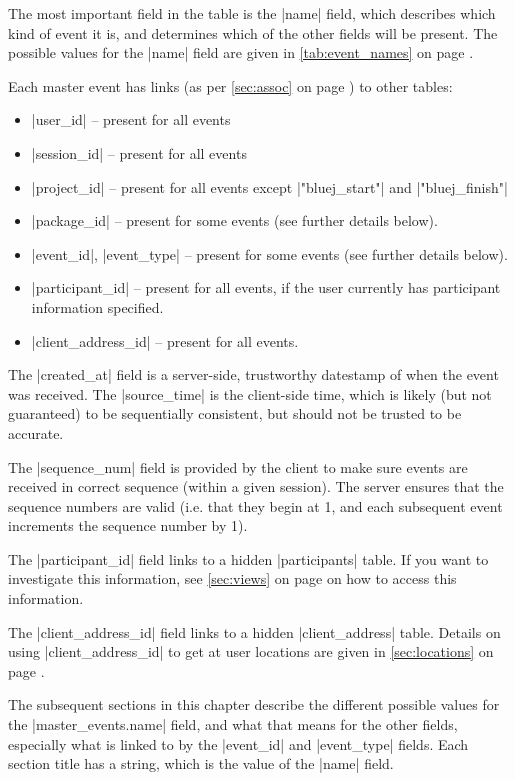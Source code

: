 \documentclass{report}
\newcommand{\myref}[1]{\autoref{#1} on page \pageref*{#1}}
\begin{document}

The most important field in the table is the |name| field, which describes
which kind of event it is, and determines which of the other fields will be
present.  The possible values for the |name| field are given in \myref{tab:event_names}.

Each master event has links (as per \myref{sec:assoc}) to other tables:
\begin{itemize}
\item |user_id| -- present for all events
\item |session_id| -- present for all events
\item |project_id| -- present for all events except |"bluej_start"| and |"bluej_finish"|
\item |package_id| -- present for some events (see further details below).
\item |event_id|, |event_type| -- present for some events (see further details below).
\item |participant_id| -- present for all events, if the user currently has
  participant information specified.
\item |client_address_id| -- present for all events.
\end{itemize}

The |created_at| field is a server-side, trustworthy datestamp of when
the event was received.  The |source_time| is the client-side time,
which is likely (but not guaranteed) to be sequentially consistent, but should
not be trusted to be accurate.

The |sequence_num| field is provided by the client to make sure events are
received in correct sequence (within a given session).  The server ensures
that the sequence numbers are valid (i.e. that they begin at 1, and each
subsequent event increments the sequence number by 1).


The |participant_id| field links to a hidden |participants| table.  If you
want to investigate this information, see \myref{sec:views} on how to
access this information.


The |client_address_id| field links to a hidden |client_address| table.  Details
on using |client_address_id| to get at user locations are given in \myref{sec:locations}.


The subsequent sections in this chapter describe the different possible values for the
|master_events.name| field, and what that means for the other fields,
especially what is linked to by the |event_id| and |event_type| fields.  Each
section title has a string, which is the value of the |name| field.
\end{document}
